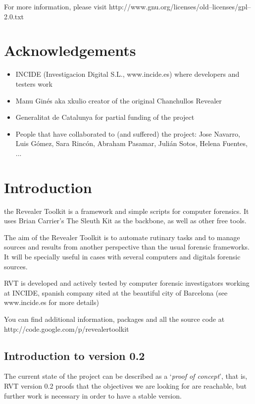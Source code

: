 \documentclass[a4paper,11pt,oneside]{report}
\begin{document}
     For more information, please visit
     http://www.gnu.org/licenses/old--licenses/gpl--2.0.txt


\chapter{Acknowledgements}

\begin{itemize}
     \item INCIDE (Investigacion Digital S.L., www.incide.es)
       where developers and testers work
     \item Manu Ginés aka xkulio 
       creator of the original Chanchullos Revealer
     \item Generalitat de Catalunya
       for partial funding of the project
       
     \item People that have collaborated to (and suffered) the project:  Jose Navarro, Luis Gómez, Sara Rincón, Abraham Pasamar, Julián Sotos, Helena Fuentes, ... 
\end{itemize}



\chapter{Introduction}

the Revealer Toolkit is a framework and simple scripts for computer forensics. It uses Brian Carrier's The Sleuth Kit as the backbone, as well as other free tools.

The aim of the Revealer Toolkit is to automate rutinary tasks and to manage sources and results from another perspective than the usual forensic frameworks. It will be specially useful in cases with several computers and digitals forensic sources. 

RVT is developed and actively tested by computer forensic investigators working at INCIDE, spanish company sited at the beautiful city of Barcelona (see www.incide.es for more details)

You can find additional information, packages and all the source code at http://code.google.com/p/revealertoolkit


\section*{Introduction to version 0.2}

The current state of the project can be described as a `\emph{proof of concept}', that is, RVT version 0.2 proofs that the objectives we are looking for are reachable, but further work is necessary in order to have a stable version.
\end{document}
